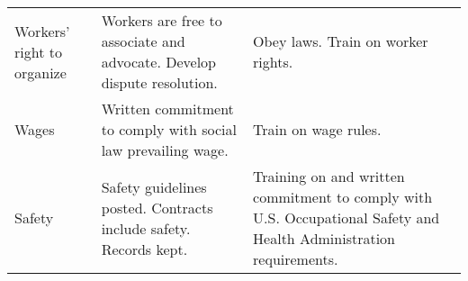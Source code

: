 \begin{table}
\begin{longtable*}[]{@{}lll@{}}
\begin{minipage}[t]{0.20\columnwidth}\raggedright\strut
Workers' right to organize\strut
\end{minipage} & \begin{minipage}[t]{0.36\columnwidth}\raggedright\strut
Workers are free to associate and advocate. Develop dispute
resolution.\strut
\end{minipage} & \begin{minipage}[t]{0.36\columnwidth}\raggedright\strut
Obey laws. Train on worker rights.\strut
\end{minipage}\tabularnewline
\begin{minipage}[t]{0.20\columnwidth}\raggedright\strut
Wages\strut
\end{minipage} & \begin{minipage}[t]{0.36\columnwidth}\raggedright\strut
Written commitment to comply with social law prevailing wage.\strut
\end{minipage} & \begin{minipage}[t]{0.36\columnwidth}\raggedright\strut
Train on wage rules.\strut
\end{minipage}\tabularnewline
\begin{minipage}[t]{0.20\columnwidth}\raggedright\strut
Safety\strut
\end{minipage} & \begin{minipage}[t]{0.36\columnwidth}\raggedright\strut
Safety guidelines posted. Contracts include safety. Records kept.\strut
\end{minipage} & \begin{minipage}[t]{0.36\columnwidth}\raggedright\strut
Training on and written commitment to comply with U.S. Occupational Safety and Health Administration requirements.\strut
\end{minipage}\tabularnewline
\bottomrule
\end{longtable*}

\end{table}
